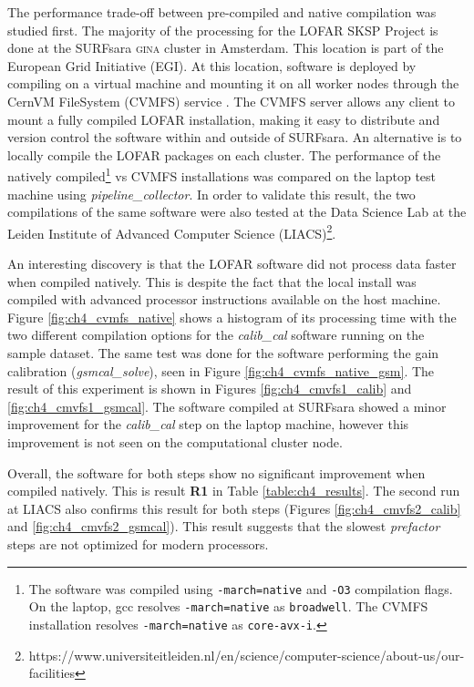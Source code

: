 The performance trade-off between pre-compiled and native compilation was studied first. The majority of the processing for the LOFAR SKSP Project \citep{lotss} is done at the SURFsara \textsc{gina} cluster in Amsterdam. This location is part of the European Grid Initiative (EGI)\citep{SurfSara}. At this location, software is deployed by compiling on a virtual machine and mounting it on all worker nodes through the CernVM FileSystem (CVMFS) service \citep{cvmfs}. The CVMFS server allows any client to mount a fully compiled LOFAR installation, making it easy to distribute and version control the software within and outside of SURFsara. An alternative is to locally compile the LOFAR packages on each cluster. The performance of the natively compiled\footnote{The software was compiled using \texttt{-march=native} and \texttt{-O3} compilation flags. On the laptop, gcc resolves \texttt{-march=native} as \texttt{broadwell}. The CVMFS installation resolves \texttt{-march=native} as \texttt{core-avx-i}.} vs CVMFS installations was compared on the laptop test machine using \textit{pipeline\_collector}. In order to validate this result, the two compilations of the same software were also tested at the Data Science Lab at the Leiden Institute of Advanced Computer Science (LIACS)\footnote{https://www.universiteitleiden.nl/en/science/computer-science/about-us/our-facilities}. 
 
An interesting discovery is that the LOFAR software did not process data faster when compiled natively. This is despite the fact that the local install was compiled with advanced processor instructions available on the host machine.  Figure \ref{fig:ch4_cvmfs_native} shows a histogram of its processing time with the two different compilation options for the \textit{calib\_cal} software running on the sample dataset. The same test was done for the software performing the gain calibration (\textit{gsmcal\_solve}), seen in Figure \ref{fig:ch4_cvmfs_native_gsm}. The result of this experiment is shown in Figures \ref{fig:ch4_cmvfs1_calib} and \ref{fig:ch4_cmvfs1_gsmcal}.  The software compiled at SURFsara showed a minor improvement for the \textit{calib\_cal} step on the laptop machine, however this improvement is not seen on the computational cluster node. 

Overall, the software for both steps show no significant improvement when compiled natively. This is result \textbf{R1} in Table \ref{table:ch4_results}. The second run at LIACS also confirms this result for both steps (Figures \ref{fig:ch4_cmvfs2_calib} and \ref{fig:ch4_cmvfs2_gsmcal}). This result suggests that the slowest \textit{prefactor} steps are not optimized for modern processors. 

